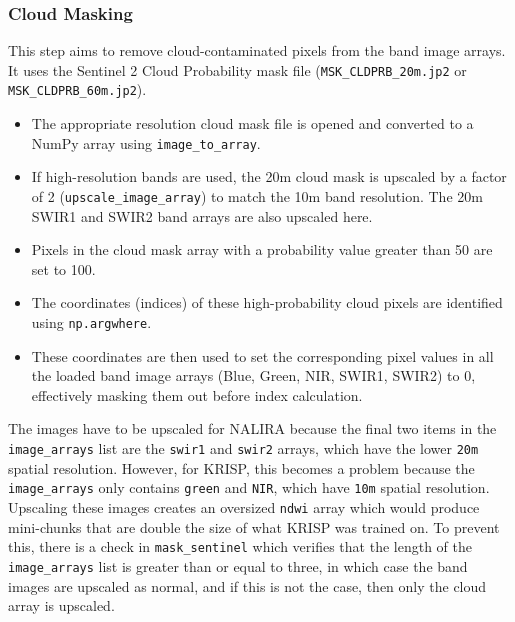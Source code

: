 \subsubsection{Cloud Masking}
This step aims to remove cloud-contaminated pixels from the band image arrays. It uses the Sentinel 2 Cloud Probability mask file (\verb|MSK_CLDPRB_20m.jp2| or \verb|MSK_CLDPRB_60m.jp2|). 
\begin{itemize}
    \item The appropriate resolution cloud mask file is opened and converted to a NumPy array using \verb|image_to_array|.
    \item If high-resolution bands are used, the 20m cloud mask is upscaled by a factor of 2 (\verb|upscale_image_array|) to match the 10m band resolution. The 20m SWIR1 and SWIR2 band arrays are also upscaled here.
    \item Pixels in the cloud mask array with a probability value greater than 50 are set to 100.
    \item The coordinates (indices) of these high-probability cloud pixels are identified using \verb|np.argwhere|.
    \item These coordinates are then used to set the corresponding pixel values in all the loaded band image arrays (Blue, Green, NIR, SWIR1, SWIR2) to 0, effectively masking them out before index calculation.
\end{itemize}
The images have to be upscaled for NALIRA because the final two items in the \verb|image_arrays| list are the \verb|swir1| and \verb|swir2| arrays, which have the lower \verb|20m| spatial resolution. However, for KRISP, this becomes a problem because the \verb|image_arrays| only contains \verb|green| and \verb|NIR|, which have \verb|10m| spatial resolution. Upscaling these images creates an oversized \verb|ndwi| array which would produce mini-chunks that are double the size of what KRISP was trained on. To prevent this, there is a check in \verb|mask_sentinel| which verifies that the length of the \verb|image_arrays| list is greater than or equal to three, in which case the band images are upscaled as normal, and if this is not the case, then only the cloud array is upscaled. 


